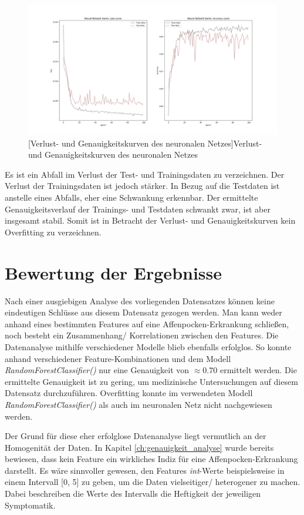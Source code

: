 \documentclass[13pt,a4paper, listof=entryprefix, bibliography=totocnumbered,toc=listofnumbered,lof=listofnumbered]{scrartcl}
\begin{document}
	\begin{figure}[H]
		\centering
		\includegraphics[width=0.8\linewidth]{Bilder/neural_network.png}
		[Verlust- und Genauigkeitskurven des neuronalen Netzes]{Verlust- und Genauigkeitskurven des neuronalen Netzes}
		\label{fig:neural_network}
	\end{figure}

Es ist ein Abfall im Verlust der Test- und Trainingsdaten zu verzeichnen. Der Verlust der Trainingsdaten ist jedoch stärker. 
In Bezug auf die Testdaten ist anstelle eines Abfalls, eher eine Schwankung erkennbar. Der ermittelte Genauigkeitsverlauf
der Trainings- und Testdaten schwankt zwar, ist aber insgesamt stabil. Somit ist in Betracht der Verlust- und Genauigkeitskurven
kein Overfitting zu verzeichnen. 

	\section{Bewertung der Ergebnisse}
		\label{ch:bewertungs_ergebnisse}

Nach einer ausgiebigen Analyse des vorliegenden Datensatzes können keine eindeutigen Schlüsse aus diesem Datensatz gezogen werden.
Man kann weder anhand eines bestimmten Features auf eine Affenpocken-Erkrankung schließen, noch besteht ein Zusammenhang/ Korrelationen
zwischen den Features. Die Datenanalyse mithilfe verschiedener Modelle blieb ebenfalls erfolglos. So konnte anhand verschiedener 
Feature-Kombinationen und dem Modell \textit{RandomForestClassifier()} nur eine Genauigkeit von $\approx 0.70$ ermittelt werden. 
Die ermittelte Genauigkeit ist zu gering, um medizinische Untersuchungen auf diesem Datensatz durchzuführen. 
Overfitting konnte im verwendeten Modell \textit{RandomForestClassifier()} als auch im neuronalen Netz nicht nachgewiesen werden. 

Der Grund für diese eher erfolglose Datenanalyse liegt vermutlich an der Homogenität der Daten. 
In Kapitel \ref{ch:genauigkeit_analyse} wurde bereits bewiesen, dass kein Feature ein wirkliches Indiz für eine 
Affenpocken-Erkrankung darstellt. Es wäre sinnvoller gewesen, den Features \textit{int}-Werte beispielsweise in einem Intervall [0, 5] 
zu geben, um die Daten vielseitiger/ heterogener zu machen. Dabei beschreiben die Werte des Intervalls die Heftigkeit der jeweiligen Symptomatik.
\end{document}
